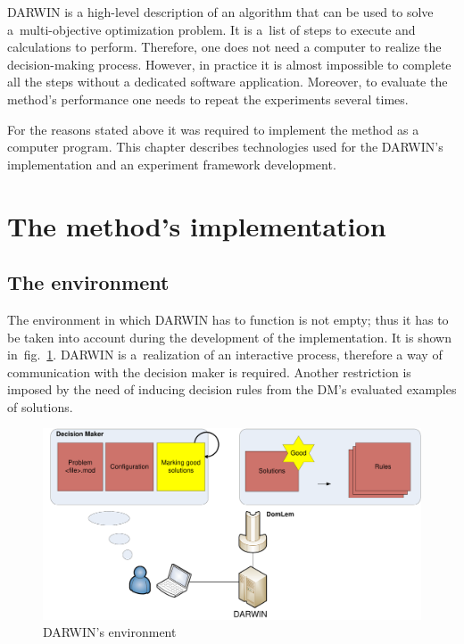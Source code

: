 DARWIN is a high-level description of an algorithm that can be used to solve
a~multi-objective optimization problem. It is a~list of steps to execute and
calculations to perform. Therefore, one does not need a computer to realize
the decision-making process. However, in practice it is almost impossible to
complete all the steps without a dedicated software application. Moreover, to
evaluate the method's performance one needs to repeat the experiments several
times.

For the reasons stated above it was required to implement the method as a
computer program. This chapter describes technologies used for the DARWIN's
implementation and an experiment framework development.

\section{The method's implementation}

\subsection{The environment}
\label{environ}

The environment in which DARWIN has to function is not empty; thus it has to
be taken into account during the development of the implementation. It is
shown in~fig.~\ref{environ}. DARWIN is a~realization of an interactive
process, therefore a way of communication with the decision maker is
required. Another restriction is imposed by the need of inducing decision
rules from the DM's evaluated examples of solutions.

\begin{figure}
  \centering \includegraphics[scale=0.5]{img/environ}
  \caption{DARWIN's environment}
  \label{environ}
\end{figure}

